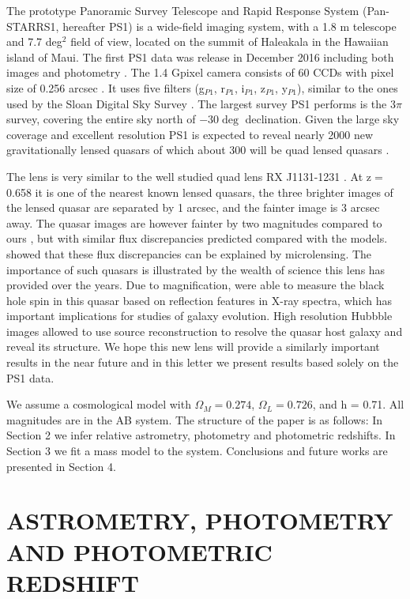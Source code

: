 \documentclass[manuscript]{aastex}
\begin{document}
The prototype Panoramic Survey Telescope and Rapid Response System (Pan-STARRS1, hereafter PS1) is a wide-field imaging system, with a 1.8 m telescope and 7.7 deg$^2$ field of view, located on the summit of Haleakala in the Hawaiian island of Maui. The first PS1 data was release in December 2016 including both images and photometry  \citep[see ][]{cha16}. The 1.4 Gpixel camera consists of 60 CCDs with pixel size of 0.256 arcsec \citep{ona08, ton09}. It uses five filters (g$_{P1}$, r$_{P1}$, i$_{P1}$, z$_{P1}$, y$_{P1}$), similar to the ones used by the Sloan Digital Sky Survey \citep[SDSS ][]{york00}. The largest survey PS1 performs is the 3$\pi$ survey, covering the entire sky north of $-30\deg$ declination. Given the large sky coverage and excellent resolution PS1 is expected to reveal nearly 2000 new gravitationally lensed quasars of which about 300 will be quad lensed quasars \citep{ogu10}.

The lens is very similar to the well studied quad lens RX J1131-1231 \citep{slu03}. At z$=$0.658 it is one of the nearest known lensed quasars, the three brighter images of the lensed quasar are separated by 1 arcsec, and the fainter image is 3 arcsec away. The quasar images are however fainter by two magnitudes compared to ours \citep{slu06}, but with similar flux discrepancies predicted compared with the models. \citet{slu08} showed that these flux discrepancies can be explained by microlensing. The importance of such quasars is illustrated by the wealth of science this lens has provided over the years.  Due to magnification, \citet{reis14} were able to measure the black hole spin in this quasar based on reflection features in X-ray spectra, which has important implications for studies of galaxy evolution. High resolution Hubbble images allowed \citet{bre08} to use source reconstruction to resolve the quasar host galaxy and reveal its structure. We hope this new lens will provide a similarly important results in the near future and in this letter we present results based solely on the PS1 data. 

 
We assume a cosmological model with $\Omega_M = 0.274$, $\Omega_L = 0.726$, and h = 0.71. All magnitudes are in the AB system. The structure of the paper is as follows:
In Section 2 we infer relative astrometry, photometry and photometric redshifts. In Section 3 we fit a mass model to the system. Conclusions and future works are presented in Section 4.



\section{ASTROMETRY, PHOTOMETRY AND PHOTOMETRIC REDSHIFT}
\end{document}
